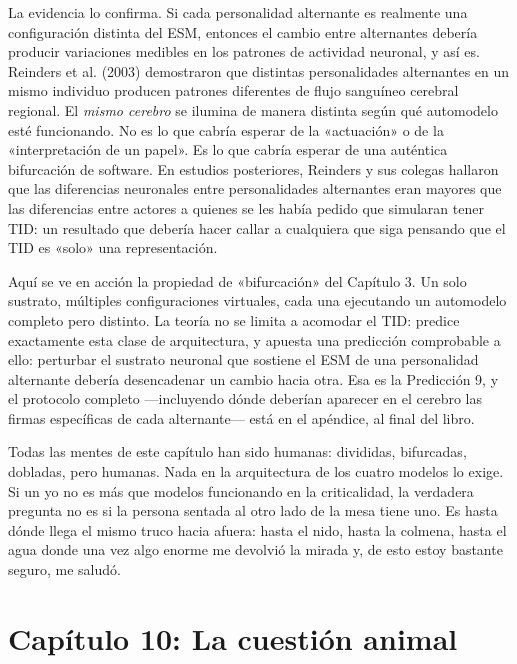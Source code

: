 \documentclass[11pt, twoside, openright]{book}
\begin{document}
La evidencia lo confirma. Si cada personalidad alternante es realmente una configuración distinta del ESM, entonces el cambio entre alternantes debería producir variaciones medibles en los patrones de actividad neuronal, y así es. Reinders et al. (2003) demostraron que distintas personalidades alternantes en un mismo individuo producen patrones diferentes de flujo sanguíneo cerebral regional. El \textit{mismo cerebro} se ilumina de manera distinta según qué automodelo esté funcionando. No es lo que cabría esperar de la «actuación» o de la «interpretación de un papel». Es lo que cabría esperar de una auténtica bifurcación de software. En estudios posteriores, Reinders y sus colegas hallaron que las diferencias neuronales entre personalidades alternantes eran mayores que las diferencias entre actores a quienes se les había pedido que simularan tener TID: un resultado que debería hacer callar a cualquiera que siga pensando que el TID es «solo» una representación.

Aquí se ve en acción la propiedad de «bifurcación» del Capítulo 3. Un solo sustrato, múltiples configuraciones virtuales, cada una ejecutando un automodelo completo pero distinto. La teoría no se limita a acomodar el TID: predice exactamente esta clase de arquitectura, y apuesta una predicción comprobable a ello: perturbar el sustrato neuronal que sostiene el ESM de una personalidad alternante debería desencadenar un cambio hacia otra. Esa es la Predicción 9, y el protocolo completo ---incluyendo dónde deberían aparecer en el cerebro las firmas específicas de cada alternante--- está en el apéndice, al final del libro.

Todas las mentes de este capítulo han sido humanas: divididas, bifurcadas, dobladas, pero humanas. Nada en la arquitectura de los cuatro modelos lo exige. Si un yo no es más que modelos funcionando en la criticalidad, la verdadera pregunta no es si la persona sentada al otro lado de la mesa tiene uno. Es hasta dónde llega el mismo truco hacia afuera: hasta el nido, hasta la colmena, hasta el agua donde una vez algo enorme me devolvió la mirada y, de esto estoy bastante seguro, me saludó.


\chapter*{Capítulo 10: La cuestión animal}
\end{document}
